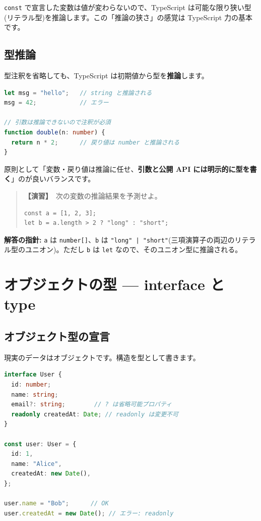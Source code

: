 \documentclass{article}
\begin{document}
\texttt{const} で宣言した変数は値が変わらないので、TypeScript は可能な限り狭い型(リテラル型)を推論します。この「推論の狭さ」の感覚は TypeScript 力の基本です。

\subsection{型推論}

型注釈を省略しても、TypeScript は初期値から型を\textbf{推論}します。

\begin{lstlisting}[language=TypeScript]
let msg = "hello";   // string と推論される
msg = 42;            // エラー

// 引数は推論できないので注釈が必須
function double(n: number) {
  return n * 2;      // 戻り値は number と推論される
}
\end{lstlisting}

原則として「変数・戻り値は推論に任せ、\textbf{引数と公開 API には明示的に型を書く}」のが良いバランスです。

\begin{quote}
\textbf{【演習】}\ 次の変数の推論結果を予測せよ。
\begin{verbatim}
const a = [1, 2, 3];
let b = a.length > 2 ? "long" : "short";
\end{verbatim}
\end{quote}

\textbf{解答の指針:} \texttt{a} は \texttt{number[]}、\texttt{b} は \texttt{"long" | "short"}(三項演算子の両辺のリテラル型のユニオン)。ただし \texttt{b} は \texttt{let} なので、そのユニオン型に推論される。

\section{オブジェクトの型 — interface と type}

\subsection{オブジェクト型の宣言}

現実のデータはオブジェクトです。構造を型として書きます。

\begin{lstlisting}[language=TypeScript]
interface User {
  id: number;
  name: string;
  email?: string;        // ? は省略可能プロパティ
  readonly createdAt: Date; // readonly は変更不可
}

const user: User = {
  id: 1,
  name: "Alice",
  createdAt: new Date(),
};

user.name = "Bob";      // OK
user.createdAt = new Date(); // エラー: readonly
\end{lstlisting}
\end{document}

